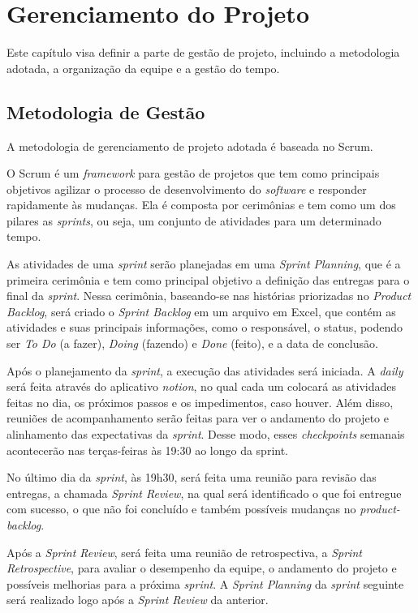 \chapter{Gerenciamento do Projeto}
Este capítulo visa definir a parte de gestão de projeto, incluindo a metodologia adotada, a organização da equipe e a gestão do tempo.

\section{Metodologia de Gestão}
A metodologia de gerenciamento de projeto adotada é baseada no Scrum.

O Scrum é um \textit{\gls{framework}} para gestão de projetos que tem como principais objetivos agilizar o processo de desenvolvimento do \textit{\gls{software}} e responder rapidamente às mudanças. Ela é composta por cerimônias e tem como um dos pilares as \textit{\glspl{sprint}}, ou seja, um conjunto de atividades para um determinado tempo. 


As atividades de uma \textit{\gls{sprint}} serão planejadas em uma \textit{Sprint Planning}, que é a primeira cerimônia e tem como principal objetivo a definição das entregas para o final da \textit{\gls{sprint}}. Nessa cerimônia, baseando-se nas histórias priorizadas no \textit{Product Backlog}, será criado o \textit{Sprint Backlog} em um arquivo em Excel, que contém as atividades e suas principais informações, como o responsável, o status, podendo ser \textit{To Do} (a fazer), \textit{Doing} (fazendo) e \textit{Done} (feito), e a data de conclusão. 


Após o planejamento da \textit{\gls{sprint}}, a execução das atividades será iniciada. A \textit{\gls{daily}} será feita através do aplicativo \textit{\gls{notion}}, no qual cada um colocará as atividades feitas no dia, os próximos passos e os impedimentos, caso houver. Além disso, reuniões de acompanhamento serão feitas para ver o andamento do projeto e alinhamento das expectativas da \textit{\gls{sprint}}. Desse modo, esses \textit{\glspl{checkpoint}} semanais acontecerão nas terças-feiras às 19:30 ao longo da sprint. 

No último dia da \textit{\gls{sprint}}, às 19h30, será feita uma reunião para revisão das entregas, a chamada \textit{Sprint Review}, na qual será identificado o que foi entregue com sucesso, o que não foi concluído e também possíveis mudanças no \textit{\gls{product-backlog}}. 


Após a \textit{Sprint Review}, será feita uma reunião de retrospectiva, a \textit{Sprint Retrospective}, para avaliar o desempenho da equipe, o andamento do projeto e possíveis melhorias para a próxima \textit{\gls{sprint}}. A \textit{Sprint Planning} da \textit{\gls{sprint}} seguinte será realizado logo após a \textit{Sprint Review} da anterior.


